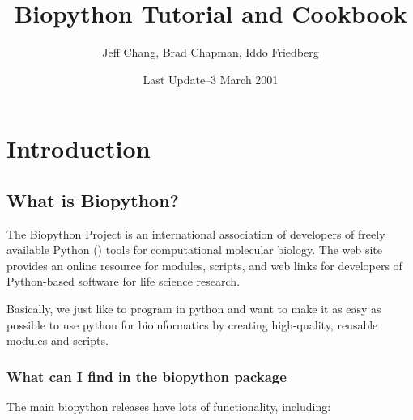 \documentclass{report}
\begin{document}
\title{Biopython Tutorial and Cookbook}
\author{Jeff Chang, Brad Chapman, Iddo Friedberg}
\date{Last Update--3 March 2001}

\maketitle
\tableofcontents

\chapter{Introduction}

\section{What is Biopython?}

The Biopython Project is an international association of developers of freely available Python () tools for computational molecular biology. The web site  provides an online resource for modules, scripts, and web links for developers of Python-based software for life science research.


Basically, we just like to program in python and want to make it as easy as possible to use python for bioinformatics by creating high-quality, reusable modules and scripts.

\subsection{What can I find in the biopython package}

The main biopython releases have lots of functionality, including:
\end{document}
